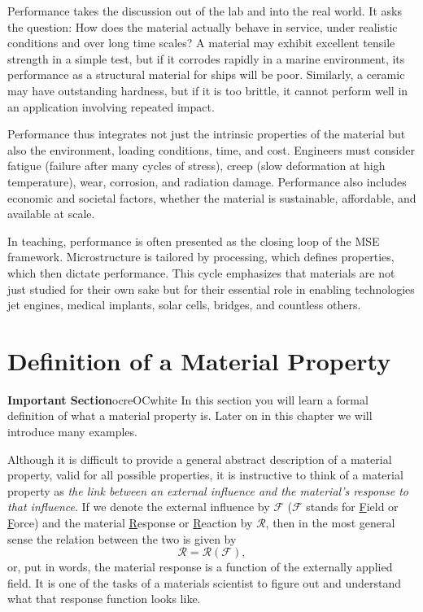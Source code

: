 Performance takes the discussion out of the lab and into the real world. It asks the question: How does the material actually behave in service, under realistic conditions and over long time scales? A material may exhibit excellent tensile strength in a simple test, but if it corrodes rapidly in a marine environment, its performance as a structural material for ships will be poor. Similarly, a ceramic may have outstanding hardness, but if it is too brittle, it cannot perform well in an application involving repeated impact.

Performance thus integrates not just the intrinsic properties of the material but also the environment, loading conditions, time, and cost. Engineers must consider fatigue (failure after many cycles of stress), creep (slow deformation at high temperature), wear, corrosion, and radiation damage. Performance also includes economic and societal factors, whether the material is sustainable, affordable, and available at scale.

In teaching, performance is often presented as the closing loop of the MSE framework. Microstructure is tailored by processing, which defines properties, which then dictate performance. This cycle emphasizes that materials are not just studied for their own sake but for their essential role in enabling technologies jet engines, medical implants, solar cells, bridges, and countless others.


\section{Definition of a Material Property}

\begin{messagebox}{{\sffamily\bfseries Important Section}}{ocre}{\icattention}{OCwhite}
In this section you will learn a formal definition of what a material property is.  Later on in this chapter we will introduce many examples.
\end{messagebox}

Although it is difficult to provide a general abstract description of a material property, valid for all possible properties, it is instructive to think of a material property as \textit{the link between an external influence and the material's response to that influence}.  If we denote the external influence by $\mathcal{F}$ ($\mathcal{F}$ stands for \underline{F}ield or \underline{F}orce) and the material \underline{R}esponse or \underline{R}eaction by $\mathcal{R}$, then in the most general sense the relation between the two is given by
\begin{equation}
	\mathcal{R}=\mathcal{R}(\mathcal{F}),\label{eq:rf}
\end{equation}
or, put in words, the material response is a function of the externally applied field.  It is one of the tasks of a materials scientist to figure out and understand what that response function looks like.

